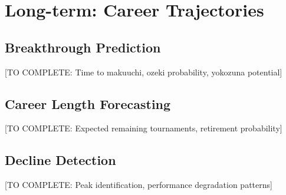 \section{Long-term: Career Trajectories}

\subsection{Breakthrough Prediction}

[TO COMPLETE: Time to makuuchi, ozeki probability, yokozuna potential]

\subsection{Career Length Forecasting}

[TO COMPLETE: Expected remaining tournaments, retirement probability]

\subsection{Decline Detection}

[TO COMPLETE: Peak identification, performance degradation patterns]